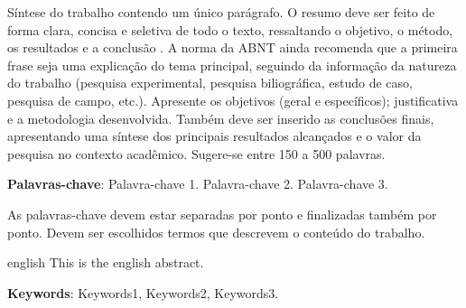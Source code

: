 
\setlength{\absparsep}{18pt} %
\begin{resumo}
Síntese do trabalho contendo um único parágrafo. O resumo deve ser feito de forma clara, concisa e seletiva de todo o texto, ressaltando o objetivo, o método, os resultados e a conclusão  \cite{NBR6028:2003}. A norma da ABNT ainda recomenda que  a primeira frase seja uma explicação do tema principal, seguindo da informação da natureza do trabalho (pesquisa experimental, pesquisa biliográfica, estudo de caso, pesquisa de campo, etc.). Apresente os objetivos (geral e específicos); justificativa e a metodologia desenvolvida. Também deve ser inserido as conclusões finais, apresentando uma síntese dos principais resultados alcançados e o valor da pesquisa no contexto acadêmico. Sugere-se entre 150 a 500 palavras.

 \vspace{\onelineskip}
 \noindent
 \textbf{Palavras-chave}: Palavra-chave 1. Palavra-chave 2. Palavra-chave 3. 

As palavras-chave devem estar separadas por ponto e finalizadas também por ponto. Devem ser escolhidos termos  que descrevem o conteúdo do trabalho.
\end{resumo}

\begin{resumo}[Abstract]
 \begin{otherlanguage*}{english}
   This is the english abstract.


   \vspace{\onelineskip}
   \noindent 
   \textbf{Keywords}: Keywords1, Keywords2, Keywords3.
 \end{otherlanguage*}
\end{resumo}